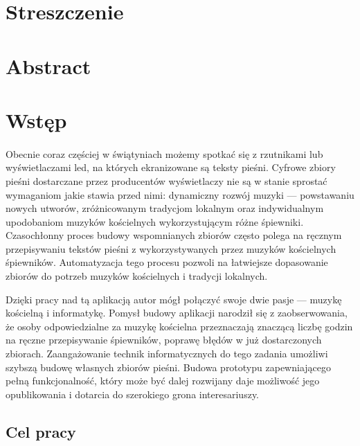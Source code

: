 \documentclass[a4paper,12pt]{article}
\begin{document}
	\setcounter{page}{2}
    \tableofcontents
	\newpage 
	
    \section*{Streszczenie}
	\section*{Abstract}
	\newpage 

	\section{Wstęp}
		\paragraph{\indent} Obecnie coraz częściej w świątyniach możemy spotkać się z rzutnikami lub wyświetlaczami led, 
			na których ekranizowane są teksty pieśni. Cyfrowe zbiory pieśni dostarczane przez producentów wyświetlaczy 
			nie są w stanie sprostać wymaganiom jakie stawia przed nimi: dynamiczny rozwój muzyki --- powstawaniu nowych utworów, 
			zróżnicowanym tradycjom lokalnym oraz indywidualnym upodobaniom muzyków kościelnych wykorzystującym różne śpiewniki. 
			Czasochłonny proces budowy wspomnianych zbiorów często polega na ręcznym przepisywaniu tekstów pieśni 
			z wykorzystywanych przez muzyków kościelnych śpiewników. Automatyzacja tego procesu pozwoli na łatwiejsze dopasowanie zbiorów 
			do potrzeb muzyków kościelnych i tradycji lokalnych. 
		\par Dzięki pracy nad tą aplikacją autor mógł połączyć swoje dwie pasje --- muzykę kościelną i informatykę. 
			Pomysł budowy aplikacji narodził się z zaobserwowania, że osoby odpowiedzialne za muzykę kościelna przeznaczają znaczącą liczbę godzin 
			na ręczne przepisywanie śpiewników, poprawę błędów w już dostarczonych zbiorach. Zaangażowanie technik informatycznych do tego zadania 
		    umożliwi szybszą budowę własnych zbiorów pieśni. 
			Budowa prototypu zapewniającego pełną funkcjonalność, który może być dalej rozwijany daje możliwość jego opublikowania 
			i dotarcia do szerokiego grona interesariuszy.  
		\subsection{Cel pracy}
\end{document}
